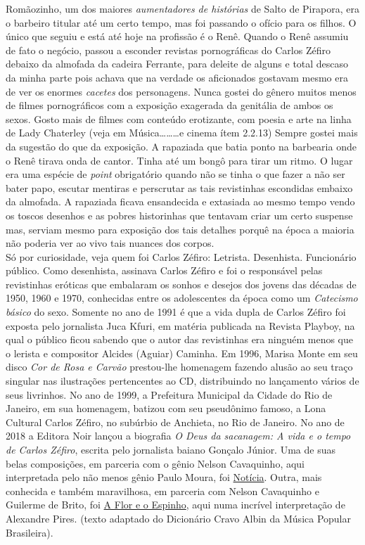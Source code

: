 \documentclass[12pt,brazil,]{book}
\begin{document}
Romãozinho, um dos maiores \emph{aumentadores de histórias} de Salto de
Pirapora, era o barbeiro titular até um certo tempo, mas foi passando o
ofício para os filhos. O único que seguiu e está até hoje na profissão é
o Renê. Quando o Renê assumiu de fato o negócio, passou a esconder
revistas pornográficas do Carlos Zéfiro debaixo da almofada da cadeira
Ferrante, para deleite de alguns e total descaso da minha parte pois
achava que na verdade os aficionados gostavam mesmo era de ver os
enormes \emph{cacetes} dos personagens. Nunca gostei do gênero muitos
menos de filmes pornográficos com a exposição exagerada da genitália de
ambos os sexos. Gosto mais de filmes com conteúdo erotizante, com poesia
e arte na linha de Lady Chaterley (veja em
Música\ldots{}\ldots{}\ldots{}e cinema ítem 2.2.13) Sempre gostei mais
da sugestão do que da exposição. A rapaziada que batia ponto na
barbearia onde o Renê tirava onda de cantor. Tinha até um bongô para
tirar um ritmo. O lugar era uma espécie de \emph{point} obrigatório
quando não se tinha o que fazer a não ser bater papo, escutar mentiras e
perscrutar as tais revistinhas escondidas embaixo da almofada. A
rapaziada ficava ensandecida e extasiada ao mesmo tempo vendo os toscos
desenhos e as pobres historinhas que tentavam criar um certo suspense
mas, serviam mesmo para exposição dos tais detalhes porquê na época a
maioria não poderia ver ao vivo tais nuances dos corpos.\\
Só por curiosidade, veja quem foi Carlos Zéfiro: Letrista. Desenhista.
Funcionário público. Como desenhista, assinava Carlos Zéfiro e foi o
responsável pelas revistinhas eróticas que embalaram os sonhos e desejos
dos jovens das décadas de 1950, 1960 e 1970, conhecidas entre os
adolescentes da época como um \emph{Catecismo básico} do sexo. Somente
no ano de 1991 é que a vida dupla de Carlos Zéfiro foi exposta pelo
jornalista Juca Kfuri, em matéria publicada na Revista Playboy, na qual
o público ficou sabendo que o autor das revistinhas era ninguém menos
que o lerista e compositor Alcides (Aguiar) Caminha. Em 1996, Marisa
Monte em seu disco \emph{Cor de Rosa e Carvão} prestou-lhe homenagem
fazendo alusão ao seu traço singular nas ilustrações pertencentes ao CD,
distribuindo no lançamento vários de seus livrinhos. No ano de 1999, a
Prefeitura Municipal da Cidade do Rio de Janeiro, em sua homenagem,
batizou com seu pseudônimo famoso, a Lona Cultural Carlos Zéfiro, no
subúrbio de Anchieta, no Rio de Janeiro. No ano de 2018 a Editora Noir
lançou a biografia \emph{O Deus da sacanagem: A vida e o tempo de Carlos
Zéfiro}, escrita pelo jornalista baiano Gonçalo Júnior. Uma de suas
belas composições, em parceria com o gênio Nelson Cavaquinho, aqui
interpretada pelo não menos gênio Paulo Moura, foi
\href{https://www.youtube.com/watch?v=fKfYOJjjOQc}{Notícia}. Outra, mais
conhecida e também maravilhosa, em parceria com Nelson Cavaquinho e
Guilerme de Brito, foi
\href{https://www.youtube.com/watch?v=l5rIRWU5rEM}{A Flor e o Espinho},
aqui numa incrível interpretação de Alexandre Pires. (texto adaptado do
Dicionário Cravo Albin da Música Popular Brasileira).
\end{document}
